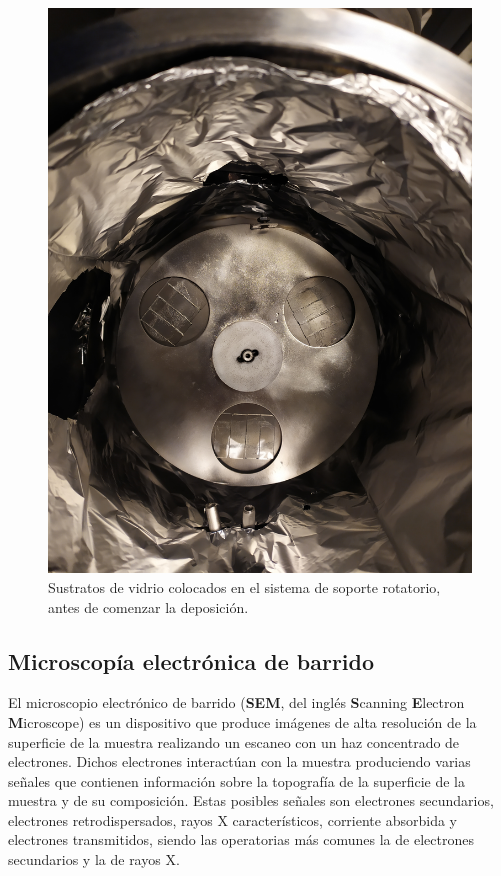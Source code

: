 \documentclass[12pt]{article}
\theoremstyle{definition}
\theoremstyle{remark}
\begin{document}
\begin{figure}[H]
	\centering
	\includegraphics[scale=0.1]{img/muestras.jpg}
	\caption{Sustratos de vidrio colocados en el sistema de soporte rotatorio, antes de comenzar la deposición.}
	\label{muestras}
\end{figure}

\subsection{Microscopía electrónica de barrido}
El microscopio electrónico de barrido (\textbf{SEM}, del inglés \textbf{S}canning \textbf{E}lectron \textbf{M}icroscope) es un dispositivo que produce imágenes de alta resolución de la superficie de la muestra realizando un escaneo con un haz concentrado de electrones. Dichos electrones interactúan con la muestra produciendo varias señales que contienen información sobre la topografía de la superficie de la muestra y de su composición. Estas posibles señales son electrones secundarios, electrones retrodispersados, rayos X característicos, corriente absorbida y electrones transmitidos, siendo las operatorias más comunes la de electrones secundarios y la de rayos X.
\end{document}
